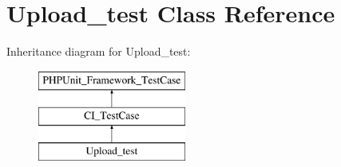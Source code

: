 \hypertarget{class_upload__test}{}\section{Upload\+\_\+test Class Reference}
\label{class_upload__test}
Inheritance diagram for Upload\+\_\+test\+:\begin{figure}[H]
\begin{center}
\leavevmode
\includegraphics[height=3.000000cm]{class_upload__test}
\end{center}
\end{figure}

